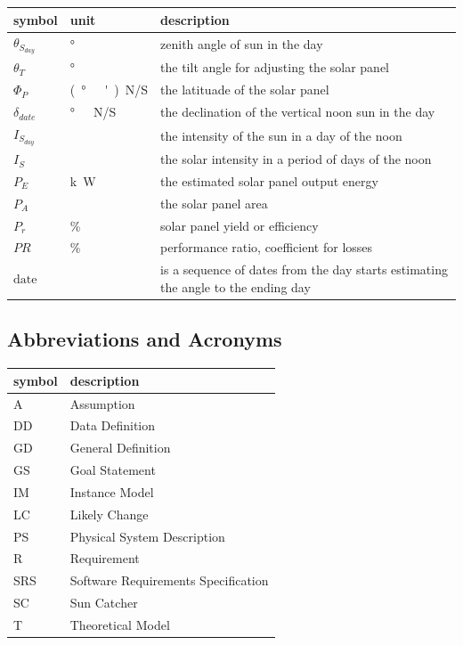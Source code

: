 \documentclass[12pt]{article}
\begin{document}
\renewcommand{\arraystretch}{1.2}
\noindent \begin{longtable*}{l l p{12cm}} \toprule
\textbf{symbol} & \textbf{unit} & \textbf{description}\\
\midrule 
$\theta_{S_{day}}$ & \si[per-mode=symbol] {\degree} & zenith angle of sun in the day
\\
$\theta_{T}$ & \si[per-mode=symbol] {\degree} & the tilt angle for adjusting the solar panel
\\
$\Phi_P$ & \si[per-mode=symbol] {(\degree \  ')N/S} & the latituade of the solar panel
\\ 
$\delta_{date}$ & \si[per-mode=symbol] {\degree \ N/S} & the declination of the vertical noon sun in the day
\\ 
$I_{S_{day}}$ & \si[per-mode=symbol] {} & the intensity of the sun in a day of the noon
\\ 
$I_{S}$ & \si[per-mode=symbol] {} & the solar intensity in a period of days of the noon
\\ 
$P_{E}$ & \si[per-mode=symbol] {k\watt} &the estimated solar panel output energy
\\ 
$P_{A}$ & \si[per-mode=symbol] {} & the solar panel area
\\ 
$P_{r}$ & \si[per-mode=symbol] {\%} & solar panel yield or efficiency
\\ 
$PR$ & \si[per-mode=symbol] {\%} & performance ratio, coefficient for losses 
\\ 
$\text{date}$ & \si[per-mode=symbol] {\text{-}} & is a sequence of dates from the day starts estimating the angle to the ending day
\\ 
\bottomrule
\end{longtable*}

\subsection{Abbreviations and Acronyms}

\renewcommand{\arraystretch}{1.2}
\begin{tabular}{l l} 
  \toprule		
  \textbf{symbol} & \textbf{description}\\
  \midrule 
  A & Assumption\\
  DD & Data Definition\\
  GD & General Definition\\
  GS & Goal Statement\\
  IM & Instance Model\\
  LC & Likely Change\\
  PS & Physical System Description\\
  R & Requirement\\
  SRS & Software Requirements Specification\\
  SC & Sun Catcher\\
  T & Theoretical Model\\
  \bottomrule
\end{tabular}\\
\end{document}

